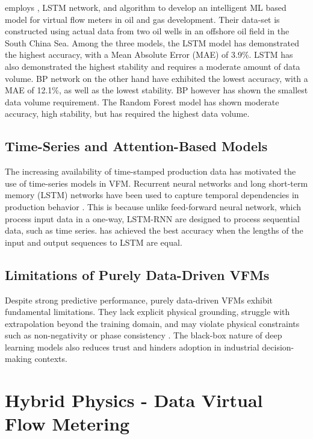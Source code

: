 \documentclass[12pt,APA]{uomthesis}
\begin{document}
\citep{song2022intelligent} employs , LSTM network, and  algorithm to develop an intelligent ML based model for virtual flow meters in oil and gas development. Their data-set is constructed using actual data from two oil wells in an offshore oil field in the South China Sea. Among the three models, the LSTM model has demonstrated the highest accuracy, with a Mean Absolute Error (MAE) of 3.9\%. LSTM has also demonstrated the highest stability and requires a moderate amount of data volume. BP network on the other hand have exhibited the lowest accuracy, with a MAE of 12.1\%, as well as the lowest stability. BP however has shown the smallest data volume requirement. The Random Forest model has shown moderate accuracy, high stability, but has required the highest data volume.

\subsection{Time-Series and Attention-Based Models}
The increasing availability of time-stamped production data has motivated the use of time-series models in VFM. Recurrent neural networks and long short-term memory (LSTM) networks have been used to capture temporal dependencies in production behavior \citep{andrianov2018machine}.
This is because unlike feed-forward neural network, which process input data in a one-way, LSTM-RNN are designed to process sequential data, such as time series. \citep{andrianov2018machine} has achieved the best accuracy when the lengths of the input and output sequences to LSTM are equal. 

\subsection{Limitations of Purely Data-Driven VFMs}
Despite strong predictive performance, purely data-driven VFMs exhibit fundamental limitations. They lack explicit physical grounding, struggle with extrapolation beyond the training domain, and may violate physical constraints such as non-negativity or phase consistency \citep{bikmukhametov2020first}. The black-box nature of deep learning models also reduces trust and hinders adoption in industrial decision-making contexts.

\section{Hybrid Physics - Data Virtual Flow Metering}
\end{document}
